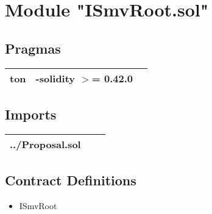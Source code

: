 
\section{Module "ISmvRoot.sol"}


\subsection{Pragmas}


\noindent\begin{tabular}{|l|l|p{5cm}|}\hline
ton & -solidity $>$= 0.42.0 &\\\hline
\end{tabular}


\subsection{Imports}


\noindent\begin{tabular}{|l|l|p{5cm}|}\hline
../Proposal.sol &\\\hline
\end{tabular}


\subsection{Contract Definitions}

\begin{itemize}
\item ISmvRoot
\end{itemize}

